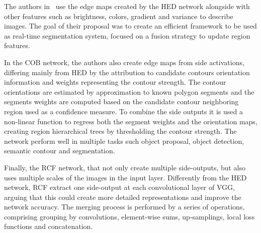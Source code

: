 The authors in~\cite{cheng2016} use the edge maps created by the HED network alongside with other features such as brightness, colors, gradient and variance to describe images. The goal of their proposal was to create an efficient framework to be used as real-time segmentation system, focused on a fusion strategy to update region features.


In the COB network, the authors also create edge maps from side activations, differing mainly from HED by the attribution to candidate contours orientation information and weights representing the contour strength. The contour orientations are estimated by approximation to known polygon segments and the segments weights are computed based on the candidate contour neighboring region used as a confidence measure. To combine the side outputs it is used a non-linear function to regress both the segment weights and the orientation maps, creating region hierarchical trees by thresholding the contour strength. The network perform well in multiple tasks such object proposal, object detection, semantic contour and segmentation.


Finally, the RCF network, that not only create multiple side-outputs, but also uses multiple scales of the images in the input layer. Differently from the HED network, RCF extract one side-output at each convolutional layer of VGG, arguing that  this could create more detailed representations and improve the network accuracy. The merging process is performed by a series of operations, comprising grouping by convolutions, element-wise sums, up-samplings, local loss functions and concatenation.  






